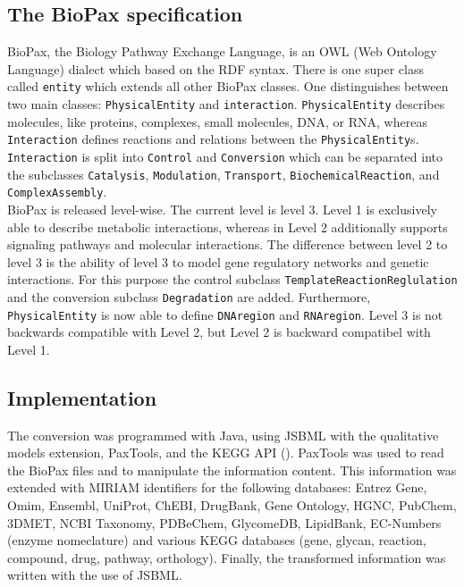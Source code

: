 \documentclass{bioinfo}
\begin{document}
\begin{methods}
\subsection{The BioPax specification}
BioPax, the Biology Pathway Exchange Language, is an OWL (Web Ontology Language) dialect which based on the RDF syntax.
There is one super class called \texttt{entity} which extends all other BioPax classes. 
One distinguishes between two main classes: \texttt{PhysicalEntity} and \texttt{interaction}. 
\texttt{PhysicalEntity} describes molecules, like proteins, complexes, small molecules, DNA, or RNA, whereas \texttt{Interaction} defines reactions and relations between the \texttt{PhysicalEntity}s. 
\texttt{Interaction} is split into \texttt{Control} and \texttt{Conversion} which can be separated into the subclasses \texttt{Catalysis}, \texttt{Modulation}, \texttt{Transport}, \texttt{BiochemicalReaction}, and \texttt{Complex\-Assembly}.\\
BioPax is released level-wise. 
The current level is level 3. 
Level 1 is exclusively able to describe metabolic interactions, whereas in Level 2 additionally supports signaling pathways and molecular interactions. 
The difference between level 2 to level 3 is the ability of level 3 to model gene regulatory networks and genetic interactions. 
For this purpose the control subclass \texttt{TemplateReactionReglulation} and the conversion subclass \texttt{Degradation} are added. 
Furthermore, \texttt{PhysicalEntity} is now able to define \texttt{DNAregion} and \texttt{RNAregion}.
Level 3 is not backwards compatible with Level 2, but Level 2 is backward compatibel with Level 1. \citep{Demir2010}
\subsection{Implementation}
The conversion was programmed with Java, using JSBML \citep{Draeger2011} with the qualitative models extension, PaxTools, and the KEGG API (\citep{Kanehisa2006}). 
PaxTools was used to read the BioPax files and to manipulate the information content. 
This information was extended with MIRIAM identifiers for the following databases: Entrez Gene, Omim, Ensembl, UniProt, ChEBI, DrugBank, Gene Ontology, HGNC, PubChem, 3DMET, NCBI Taxonomy, PDBeChem, GlycomeDB, LipidBank, EC-Numbers (enzyme nomeclature) and various KEGG databases (gene, glycan, reaction, compound, drug, pathway, orthology).
Finally, the transformed information was written with the use of JSBML.\\

\end{methods}
\end{document}
